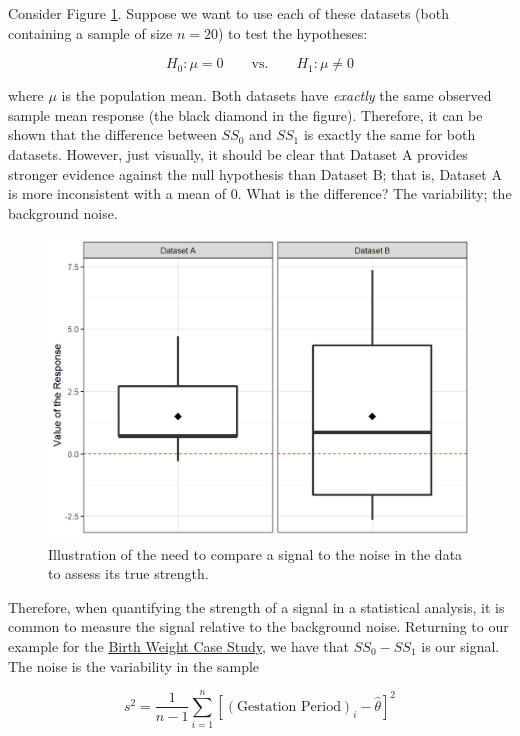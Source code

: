 \documentclass[
]{book}
\theoremstyle{plain}
\theoremstyle{mydefn}
\theoremstyle{myexmpl}
\theoremstyle{remark}
\begin{document}
Consider Figure \ref{fig:singleteststat-signal-to-noise}. Suppose we want to use each of these datasets (both containing a sample of size \(n = 20\)) to test the hypotheses:

\[H_0: \mu = 0 \qquad \text{vs.} \qquad H_1: \mu \neq 0\]

where \(\mu\) is the population mean. Both datasets have \emph{exactly} the same observed sample mean response (the black diamond in the figure). Therefore, it can be shown that the difference between \(SS_0\) and \(SS_1\) is exactly the same for both datasets. However, just visually, it should be clear that Dataset A provides stronger evidence against the null hypothesis than Dataset B; that is, Dataset A is more inconsistent with a mean of 0. What is the difference? The variability; the background noise.

\begin{figure}

{\centering \includegraphics[width=0.8\linewidth]{./Images/singleteststat-signal-to-noise-1} 

}

\caption{Illustration of the need to compare a signal to the noise in the data to assess its true strength.}\label{fig:singleteststat-signal-to-noise}
\end{figure}

Therefore, when quantifying the strength of a signal in a statistical analysis, it is common to measure the signal relative to the background noise. Returning to our example for the \protect\hyperlink{CaseBabies}{Birth Weight Case Study}, we have that \(SS_0 - SS_1\) is our signal. The noise is the variability in the sample

\[s^2 = \frac{1}{n-1}\sum_{i=1}^{n} \left[(\text{Gestation Period})_i - \widehat{\theta}\right]^2\]
\end{document}
